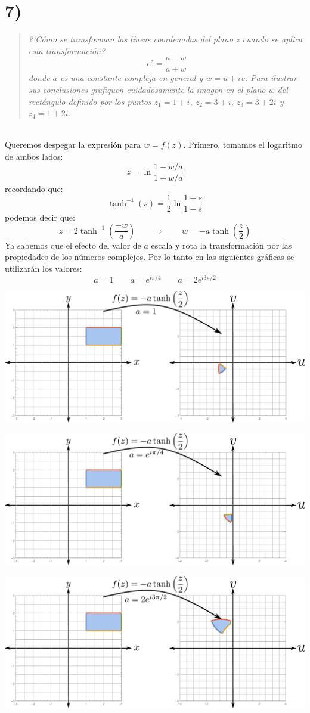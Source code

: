 \documentclass{article}
\begin{document}
\section*{7)}
\begin{quote}
\textit{?`Cómo se transforman las líneas coordenadas del plano z cuando se aplica esta transformación?
$$e^z =\dfrac{a-w}{a+w}$$
donde $a$ es una constante compleja en general y $w = u + iv$. Para ilustrar sus conclusiones grafiquen cuidadosamente la imagen en el plano $w$ del rectángulo definido por los puntos $z_1 = 1 + i$, $z_2 = 3 + i$, $z_3 = 3 + 2i$ y $z_4 = 1+2i$.}
\end{quote}\hspace{0.25cm}\\
Queremos despegar la expresión para $w=f(z)$. Primero, tomamos el logaritmo de ambos lados:
$$z=\ln\dfrac{1-w/a}{1+w/a}$$
recordando que:
$$\tanh^{-1}(s)=\dfrac{1}{2}\ln\dfrac{1+s}{1-s}$$
podemos decir que:
$$z=2\tanh^{-1}\left(\dfrac{-w}{a}\right) \qquad \Rightarrow \qquad  w=-a\tanh\left(\dfrac{z}{2} \right)$$
Ya sabemos que el efecto del valor de $a$ escala y rota la transformación por las propiedades de los números complejos. Por lo tanto en las siguientes gráficas se utilizarán los valores:
$$a=1 \qquad a=e^{i\pi/4}\qquad a=2e^{i3\pi/2}$$
\begin{center}
\includegraphics[scale=0.45]{fig8.pdf}
\end{center}
\begin{center}
\includegraphics[scale=0.45]{fig9.pdf}
\end{center}
\begin{center}
\includegraphics[scale=0.45]{fig10.pdf}
\end{center}
\end{document}
